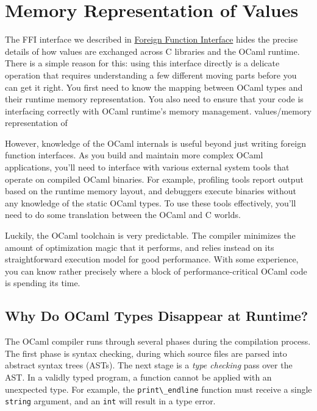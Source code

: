 \hypertarget{memory-representation-of-values}{%
\section{Memory Representation of
Values}\label{memory-representation-of-values}}

The FFI interface we described in
\href{foreign-function-interface.html\#foreign-function-interface}{Foreign
Function Interface} hides the precise details of how values are
exchanged across C libraries and the OCaml runtime. There is a simple
reason for this: using this interface directly is a delicate operation
that requires understanding a few different moving parts before you can
get it right. You first need to know the mapping between OCaml types and
their runtime memory representation. You also need to ensure that your
code is interfacing correctly with OCaml runtime's memory management.
\protect\hypertarget{VALmemory}{}{values/memory
representation of}

However, knowledge of the OCaml internals is useful beyond just writing
foreign function interfaces. As you build and maintain more complex
OCaml applications, you'll need to interface with various external
system tools that operate on compiled OCaml binaries. For example,
profiling tools report output based on the runtime memory layout, and
debuggers execute binaries without any knowledge of the static OCaml
types. To use these tools effectively, you'll need to do some
translation between the OCaml and C worlds.

Luckily, the OCaml toolchain is very predictable. The compiler minimizes
the amount of optimization magic that it performs, and relies instead on
its straightforward execution model for good performance. With some
experience, you can know rather precisely where a block of
performance-critical OCaml code is spending its time.

\hypertarget{why-do-ocaml-types-disappear-at-runtime}{%
\subsection{Why Do OCaml Types Disappear at
Runtime?}\label{why-do-ocaml-types-disappear-at-runtime}}

The OCaml compiler runs through several phases during the compilation
process. The first phase is syntax checking, during which source files
are parsed into abstract syntax trees (ASTs). The next stage is a
\emph{type checking} pass over the AST. In a validly typed program, a
function cannot be applied with an unexpected type. For example, the
\passthrough{\lstinline!print\_endline!} function must receive a single
\passthrough{\lstinline!string!} argument, and an
\passthrough{\lstinline!int!} will result in a type error.

